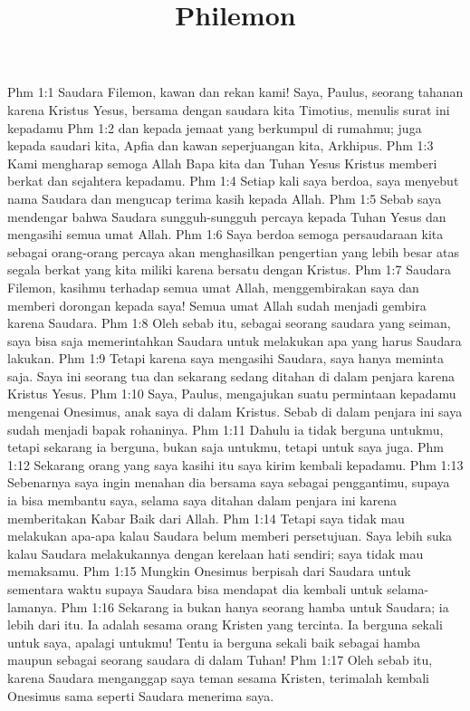 

\title{Philemon}

Phm 1:1  Saudara Filemon, kawan dan rekan kami! Saya, Paulus, seorang tahanan karena Kristus Yesus, bersama dengan saudara kita Timotius, menulis surat ini kepadamu
Phm 1:2  dan kepada jemaat yang berkumpul di rumahmu; juga kepada saudari kita, Apfia dan kawan seperjuangan kita, Arkhipus.
Phm 1:3  Kami mengharap semoga Allah Bapa kita dan Tuhan Yesus Kristus memberi berkat dan sejahtera kepadamu.
Phm 1:4  Setiap kali saya berdoa, saya menyebut nama Saudara dan mengucap terima kasih kepada Allah.
Phm 1:5  Sebab saya mendengar bahwa Saudara sungguh-sungguh percaya kepada Tuhan Yesus dan mengasihi semua umat Allah.
Phm 1:6  Saya berdoa semoga persaudaraan kita sebagai orang-orang percaya akan menghasilkan pengertian yang lebih besar atas segala berkat yang kita miliki karena bersatu dengan Kristus.
Phm 1:7  Saudara Filemon, kasihmu terhadap semua umat Allah, menggembirakan saya dan memberi dorongan kepada saya! Semua umat Allah sudah menjadi gembira karena Saudara.
Phm 1:8  Oleh sebab itu, sebagai seorang saudara yang seiman, saya bisa saja memerintahkan Saudara untuk melakukan apa yang harus Saudara lakukan.
Phm 1:9  Tetapi karena saya mengasihi Saudara, saya hanya meminta saja. Saya ini seorang tua dan sekarang sedang ditahan di dalam penjara karena Kristus Yesus.
Phm 1:10  Saya, Paulus, mengajukan suatu permintaan kepadamu mengenai Onesimus, anak saya di dalam Kristus. Sebab di dalam penjara ini saya sudah menjadi bapak rohaninya.
Phm 1:11  Dahulu ia tidak berguna untukmu, tetapi sekarang ia berguna, bukan saja untukmu, tetapi untuk saya juga.
Phm 1:12  Sekarang orang yang saya kasihi itu saya kirim kembali kepadamu.
Phm 1:13  Sebenarnya saya ingin menahan dia bersama saya sebagai penggantimu, supaya ia bisa membantu saya, selama saya ditahan dalam penjara ini karena memberitakan Kabar Baik dari Allah.
Phm 1:14  Tetapi saya tidak mau melakukan apa-apa kalau Saudara belum memberi persetujuan. Saya lebih suka kalau Saudara melakukannya dengan kerelaan hati sendiri; saya tidak mau memaksamu.
Phm 1:15  Mungkin Onesimus berpisah dari Saudara untuk sementara waktu supaya Saudara bisa mendapat dia kembali untuk selama-lamanya.
Phm 1:16  Sekarang ia bukan hanya seorang hamba untuk Saudara; ia lebih dari itu. Ia adalah sesama orang Kristen yang tercinta. Ia berguna sekali untuk saya, apalagi untukmu! Tentu ia berguna sekali baik sebagai hamba maupun sebagai seorang saudara di dalam Tuhan!
Phm 1:17  Oleh sebab itu, karena Saudara menganggap saya teman sesama Kristen, terimalah kembali Onesimus sama seperti Saudara menerima saya.
